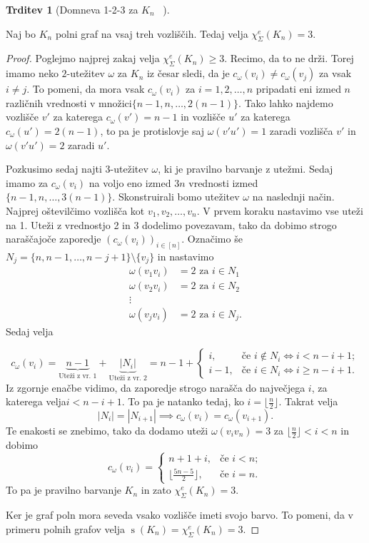 \documentclass[12pt,a4paper,twoside]{article}
\theoremstyle{definition} %
\theoremstyle{plain} %
\newtheorem{trditev}[definicija]{Trditev}
\newcommand{\ec}{\chi_{\Sigma}^e}
\numberwithin{equation}{section}  %
\DeclareMathOperator{\s}{s}
\begin{document}
\begin{trditev}[Domneva 1-2-3 za $K_n$~\citet{examples} ]
\end{trditev}
Naj bo $K_n$ polni graf na vsaj treh vozliščih. Tedaj velja $\ec(K_n) = 3$.
	\begin{proof}


Poglejmo najprej zakaj velja $\ec(K_n) \ge 3$. Recimo, da to ne drži. Torej imamo neko $2$-utežitev $\omega$ za $K_n$ iz česar sledi, da je $c_{\omega}(v_i) \neq c_{\omega}(v_j)$ za vsak $ i \neq j$. To pomeni, da mora vsak $c_{\omega}(v_i)$ za $i=1,2,\ldots,n$ pripadati eni izmed $n$ različnih vrednosti v množici$\{n-1, n, \ldots, 2(n-1)\}$. Tako lahko najdemo vozlišče $v'$ za katerega $c_{\omega}(v') = n-1$ in vozlišče $u'$ za katerega $c_{\omega}(u') = 2(n-1)$, to pa je protislovje saj $\omega(v'u') = 1$ zaradi vozlišča $v'$ in $\omega(v'u') = 2$ zaradi $u'$.

 Pozkusimo sedaj najti $3$-utežitev $\omega$, ki je pravilno barvanje z utežmi. Sedaj imamo za $c_{\omega}(v_i)$ na voljo eno izmed $3n$ vrednosti izmed $\{n-1, n, \ldots, 3(n-1)\}$. Skonstruirali bomo utežitev $\omega$ na naslednji način. Najprej oštevilčimo vozlišča kot $v_1, v_2, \ldots, v_n$. V prvem koraku nastavimo vse uteži na 1. Uteži z vrednostjo 2 in 3 dodelimo povezavam, tako da dobimo strogo naraščajoče zaporedje $\left(c_{\omega}(v_i)\right)_{i \in [n]}$. Označimo še $N_j = \{n, n-1, \ldots, n - j + 1\} \setminus \{v_j\}$ in nastavimo
 \begin{equation*}
 \begin{split}
 \omega(v_1 v_i) &= 2 \text{ za } i \in N_1 \\
 \omega(v_2v_i) &=2 \text{ za } i \in N_2\\
 \vdots \\
 \omega(v_jv_i) &= 2 \text{ za } i \in N_j .
 \end{split}
 \end{equation*}
Sedaj velja 

$$ c_{\omega}(v_i) = \underbrace{n-1}_{\text{Uteži z vr. 1}} + \underbrace{|N_i|}_{\text{Uteži z vr. 2}}   = n-1 + 
\begin{cases}
 i, & \text{če } i\notin N_i \iff i < n - i +1; \\
  i - 1, & \text{če } i \in N_i \iff i \ge n - i + 1.
\end{cases} $$
Iz zgornje enačbe vidimo, da zaporedje strogo narašča do največjega $i$, za katerega velja$ i < n - i +1$. To pa je natanko tedaj, ko $ i =  \lfloor \frac{n}{2}\rfloor$. Takrat velja
$$|N_{i}|  =| N_{i+1}| \implies c_{\omega}(v_i) = c_{\omega}(v_{i+1}).$$
Te enakosti se znebimo, tako da dodamo uteži $\omega(v_iv_n) = 3$ za $\lfloor \frac{n}{2}\rfloor < i < n$ in dobimo
$$c_{\omega}(v_i) =
\begin{cases}
n + 1 + i, & \text{če } i < n; \\
\lfloor \frac{5n-5}{2}\rfloor, & \text{če }i=n.
\end{cases} 
 $$
 To pa je pravilno barvanje $K_n$ in zato $\ec(K_n) = 3$.

Ker je graf poln mora seveda vsako vozlišče imeti svojo barvo. To pomeni, da v primeru polnih grafov velja $\s(K_n) = \ec(K_n) = 3$.
 

\end{proof}
 
\end{document}
